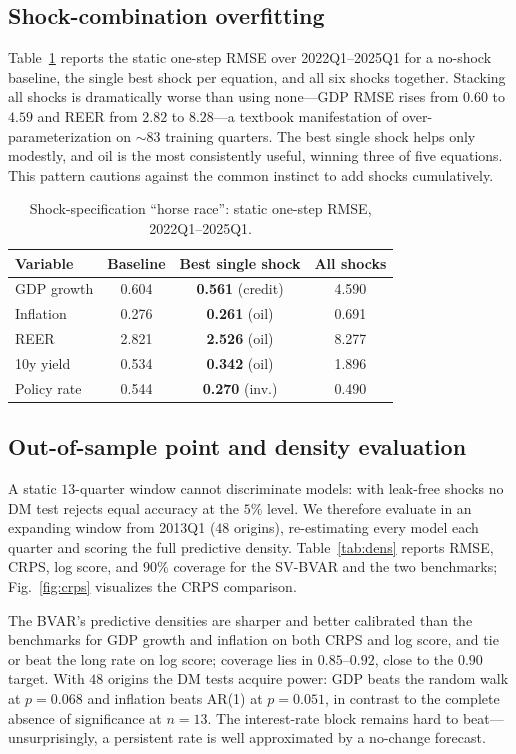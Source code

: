 \documentclass[conference]{IEEEtran}
\begin{document}
\subsection{Shock-combination overfitting}
Table~\ref{tab:horse} reports the static one-step RMSE over 2022Q1--2025Q1 for a
no-shock baseline, the single best shock per equation, and all six shocks
together. Stacking all shocks is dramatically worse than using none---GDP RMSE
rises from $0.60$ to $4.59$ and REER from $2.82$ to $8.28$---a textbook
manifestation of over-parameterization on $\sim\!83$ training quarters. The best
single shock helps only modestly, and oil is the most consistently useful,
winning three of five equations. This pattern cautions against the common
instinct to add shocks cumulatively.

\begin{table}[t]
\caption{Shock-specification ``horse race'': static one-step RMSE,
2022Q1--2025Q1.}
\label{tab:horse}
\centering
\footnotesize
\begin{tabular}{@{}lccc@{}}
\toprule
Variable & Baseline & Best single shock & All shocks \\
\midrule
GDP growth   & 0.604 & \textbf{0.561} (credit) & 4.590 \\
Inflation    & 0.276 & \textbf{0.261} (oil)    & 0.691 \\
REER         & 2.821 & \textbf{2.526} (oil)    & 8.277 \\
10y yield    & 0.534 & \textbf{0.342} (oil)    & 1.896 \\
Policy rate  & 0.544 & \textbf{0.270} (inv.)   & 0.490 \\
\bottomrule
\end{tabular}
\end{table}

\subsection{Out-of-sample point and density evaluation}
A static $13$-quarter window cannot discriminate models: with leak-free shocks
no DM test rejects equal accuracy at the $5\%$ level. We therefore evaluate in an
expanding window from 2013Q1 ($48$ origins), re-estimating every model each
quarter and scoring the full predictive density. Table~\ref{tab:dens} reports
RMSE, CRPS, log score, and $90\%$ coverage for the SV-BVAR and the two
benchmarks; Fig.~\ref{fig:crps} visualizes the CRPS comparison.

The BVAR's predictive densities are sharper and better calibrated than the
benchmarks for GDP growth and inflation on both CRPS and log score, and tie or
beat the long rate on log score; coverage lies in $0.85$--$0.92$, close to the
$0.90$ target. With $48$ origins the DM tests acquire power: GDP beats the random
walk at $p=0.068$ and inflation beats AR(1) at $p=0.051$, in contrast to the
complete absence of significance at $n=13$. The interest-rate block remains hard
to beat---unsurprisingly, a persistent rate is well approximated by a no-change
forecast.
\end{document}
